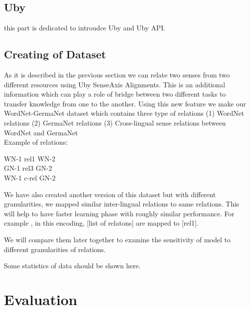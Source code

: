 \documentclass[11pt]{article}
\begin{document}
\subsection{Uby}
\label{sect:uby}

this part is dedicated to introudce Uby and Uby API. 


\subsection{Creating of Dataset}
\label{ssec:uby-rel}

As it is described in the previous section we can relate two senses from two different resources using Uby SenseAxis Alignments.
This is an additional information which can play a role of bridge between two
different tasks to transfer knowledge from one to the another.
Using this new feature we make our WordNet-GermaNet dataset which contains three type of relations 
(1) WordNet relations 
(2) GermaNet relations
(3) Cross-lingual sense relations between WordNet and GermaNet
\\
Example of relations:
\begin{center}
WN-1 \hspace{0.5in}  rel1 \hspace{0.5in}   WN-2\\
GN-1 \hspace{0.5in} rel3 \hspace{0.5in}  GN-2\\
WN-1 \hspace{0.5in} c-rel \hspace{0.5in} GN-2\\
\end{center}

We have also created another version of this dataset but with different granularities, we mapped similar inter-lingual relations to same relations.
This will help to have faster learning phase with roughly similar performance.
For example , in this encoding, [list of relatons] are mapped to [rel1].

We will compare them later together to examine the sensitivity of model to
different granularities of relations. 

Some statistics of data should be shown here.





\section{Evaluation}
\label{sec:eval}
\end{document}
